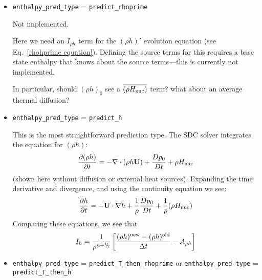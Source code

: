\begin{itemize}
\item {\tt enthalpy\_pred\_type} = {\tt predict\_rhoprime} 

Not implemented.

Here we need an $I_{\rho h}$ term for the $(\rho h)'$ evolution
equation (see Eq.~\ref{rhohprime equation}).  Defining the source
terms for this requires a base state enthalpy that knows about the
source terms---this is currently not implemented.

In particular, should $(\rho h)_0$ see a $\overline{(\rho {H_{\rm nuc}})}$ term?
what about an average thermal diffusion?



\item {\tt enthalpy\_pred\_type} = {\tt predict\_h} 

This is the most straightforward prediction type.  The SDC solver
integrates the equation for $(\rho h)$:
\begin{equation}
\frac{\partial(\rho h)}{\partial t} = -\nabla\cdot(\rho h {\bf U}) + \frac{Dp_0}{Dt}  + \rho H_{\rm nuc} 
\end{equation}
(shown here without diffusion or external heat sources).  Expanding
the time derivative and divergence, and using the continuity equation
we see:
\begin{equation}
\frac{\partial h}{\partial t} = -{\bf U} \cdot \nabla h + \frac{1}{\rho} \frac{Dp_0}{Dt}  + \frac{1}{\rho} (\rho H_{\rm nuc}) \label{eq:sdc:h}
\end{equation}
Comparing these equations, we see that 
\begin{equation}
I_{h}  = \frac{1}{\rho^{n+\myhalf}} \left [
    \frac{(\rho h)^\mathrm{new} - (\rho h)^\mathrm{old}}{\Delta t} - A_{\rho h} \right ]
\end{equation}


\item {\tt enthalpy\_pred\_type} = {\tt predict\_T\_then\_rhoprime} or 
      {\tt enthalpy\_pred\_type} = {\tt predict\_T\_then\_h} 


\end{itemize}
